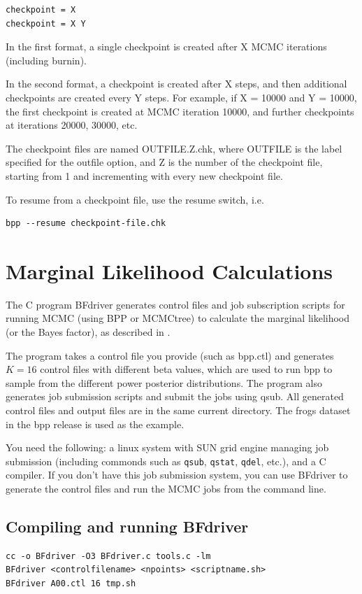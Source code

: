 \documentclass[a4paper]{book}
\numberwithin{equation}{section} \renewcommand{\baselinestretch}{0.55}
\begin{document}
\begin{verbatim}
checkpoint = X
checkpoint = X Y
\end{verbatim}
In the first format, a single checkpoint is created after X MCMC
iterations (including burnin).

In the second format, a checkpoint is created after X steps, and then
additional checkpoints are created every Y steps.  For example, if X =
10000 and Y = 10000, the first checkpoint is created at MCMC iteration
10000, and further checkpoints at iterations 20000, 30000, etc.

The checkpoint files are named OUTFILE.Z.chk, where OUTFILE is the
label specified for the outfile option, and Z is the number of the
checkpoint file, starting from 1 and incrementing with every new
checkpoint file.

To resume from a checkpoint file, use the resume switch, i.e.
\begin{verbatim}
bpp --resume checkpoint-file.chk
\end{verbatim}

\section{Marginal Likelihood Calculations}
The C program BFdriver generates control files and job subscription
scripts for running MCMC (using BPP or MCMCtree) to calculate the
marginal likelihood (or the Bayes factor), as described in
\citet{Rannala2017}.

The program takes a control file you provide (such as bpp.ctl) and
generates $K = 16$ control files with different beta values, which are
used to run bpp to sample from the different power posterior
distributions.  The program also generates job submission scripts and
submit the jobs using qsub.  All generated control files and output
files are in the same current directory.  The frogs dataset in the bpp
release \citep{Yang2015} is used as the example.

You need the following: a linux system with SUN grid engine managing
job submission (including commonds such as \texttt{qsub},
\texttt{qstat}, \texttt{qdel}, etc.), and a C compiler.  If you don't
have this job submission system, you can use BFdriver to generate the
control files and run the MCMC jobs from the command line.

\subsection{Compiling and running BFdriver}
\begin{verbatim}
cc -o BFdriver -O3 BFdriver.c tools.c -lm
BFdriver <controlfilename> <npoints> <scriptname.sh>
BFdriver A00.ctl 16 tmp.sh
\end{verbatim}
\end{document}
